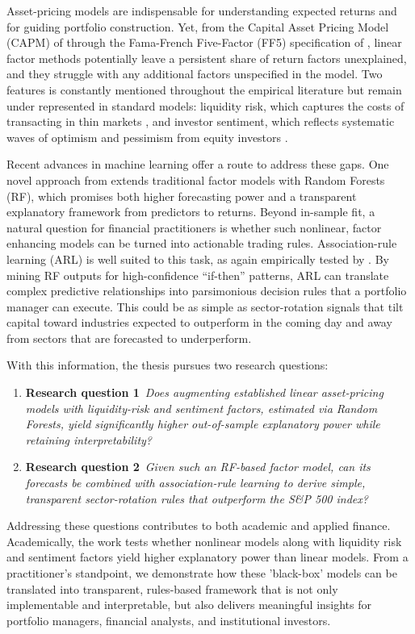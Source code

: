 Asset-pricing models are indispensable for understanding expected returns and for guiding portfolio construction. Yet, from the Capital Asset Pricing Model (CAPM) of  through the Fama-French Five-Factor (FF5) specification of , linear factor methods potentially leave a persistent share of return factors unexplained, and they struggle with any additional factors unspecified in the model. Two features is constantly mentioned throughout the empirical literature but remain under represented in standard models: liquidity risk, which captures the costs of transacting in thin markets \cite{pastor_2003,acharya_2005}, and investor sentiment, which reflects systematic waves of optimism and pessimism from equity investors \cite{baker_wurgler_2006}.

Recent advances in machine learning offer a route to address these gaps. One novel approach from  extends traditional factor models with Random Forests (RF), which promises both higher forecasting power and a transparent explanatory framework from predictors to returns. Beyond in-sample fit, a natural question for financial practitioners is whether such nonlinear, factor enhancing models can be turned into actionable trading rules. Association-rule learning (ARL) is well suited to this task, as again empirically tested by . By mining RF outputs for high-confidence “if-then” patterns, ARL can translate complex predictive relationships into parsimonious decision rules that a portfolio manager can execute. This could be as simple as sector-rotation signals that tilt capital toward industries expected to outperform in the coming day and away from sectors that are forecasted to underperform.

\bigskip
\noindent
With this information, the thesis pursues two research questions:

\begin{enumerate}
\item \textbf{Research question 1}\
\textit{Does augmenting established linear asset-pricing models with liquidity-risk and sentiment factors, estimated via Random Forests, yield significantly higher out-of-sample explanatory power while retaining interpretability?}
\item \textbf{Research question 2}\
\textit{Given such an RF-based factor model, can its forecasts be combined with association-rule learning to derive simple, transparent sector-rotation rules that outperform the S\&P 500 index?}
\end{enumerate}

Addressing these questions contributes to both academic and applied finance. Academically, the work tests whether nonlinear models along with liquidity risk and sentiment factors yield higher explanatory power than linear models. From a practitioner's standpoint, we demonstrate how these 'black-box' models can be translated into transparent, rules-based framework that is not only implementable and interpretable, but also delivers meaningful insights for portfolio managers, financial analysts, and institutional investors. 